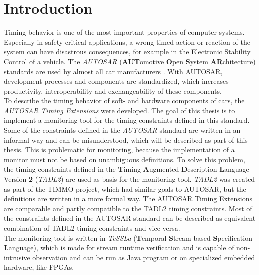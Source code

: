 
\chapter{Introduction}

	Timing behavior is one of the most important properties of computer systems. Especially in safety-critical applications, a wrong timed action or reaction of the system can have disastrous consequences, for example in the Electronic Stability Control of a vehicle. The \emph{AUTOSAR} (\textbf{AUT}omotive \textbf{O}pen \textbf{S}ystem \textbf{AR}chitecture) standards are used by almost all car manufacturers \cite{AUTOSARpartner}. With AUTOSAR, development processes and components are standardized, which increases productivity, interoperability and exchangeability of these components.\\
	To describe the timing behavior of soft- and hardware components of cars, the \emph{AUTOSAR Timing Extensions} were developed. The goal of this thesis is to implement a monitoring tool for the timing constraints defined in this standard.\\
	Some of the constraints defined in the \emph{AUTOSAR} standard are written in an informal way and can be misunderstood, which will be described as part of this thesis. This is problematic for monitoring, because the implementation of a monitor must not be based on unambiguous definitions. To solve this problem, the timing constraints defined in the \textbf{T}iming \textbf{A}ugmented \textbf{D}escription \textbf{L}anguage Version \textbf{2} (\textit{TADL2}) are used as basis for the monitoring tool. \emph{TADL2} was created as part of the TIMMO project, which had similar goals to AUTOSAR, but the definitions are written in a more formal way. The AUTOSAR Timing Extensions are comparable and partly compatible to the TADL2 timing constraints. Most of the constraints defined in the AUTOSAR standard can be described as equivalent combination of TADL2 timing constraints and vice versa.\\
	The monitoring tool is written in \emph{TeSSLa} (\textbf{T}emporal \textbf{S}tream-based \textbf{S}pecification \textbf{L}anguage), which is made for stream runtime verification and is capable of non-intrusive observation and can be run as Java program or on specialized embedded hardware, like FPGAs.

